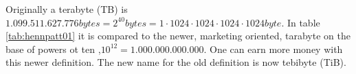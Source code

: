 Originally a terabyte (TB) is $1.099.511.627.776 bytes = 2^{40} bytes = 1 \cdot 1024 \cdot 1024 \cdot 1024 \cdot 1024 byte$. In table \ref{tab:hennpatt01} it is compared to the newer, marketing oriented, tarabyte on the base of powers ot ten ,$10^{12} = 1.000.000.000.000$. One can earn more money with this newer definition. The new name for the old definition is now tebibyte (TiB).
